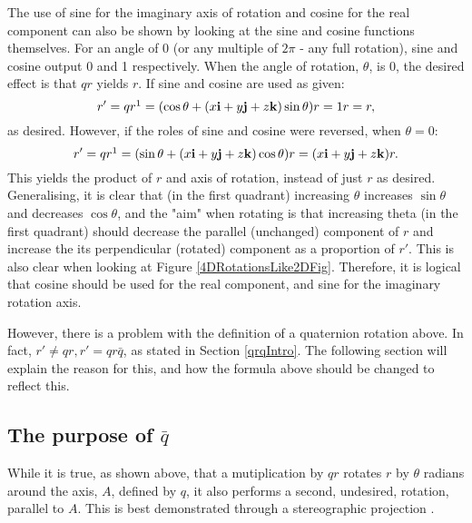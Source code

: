 \documentclass[10pt]{article}
\begin{document}
The use of sine for the imaginary axis of rotation and cosine for the real component can also be shown by looking at the sine and cosine functions themselves. For an angle of 0 (or any multiple of $2\pi$ - any full rotation), sine and cosine output 0 and 1 respectively. When the angle of rotation, $\theta$, is 0, the desired effect is that $qr$ yields $r$. If sine and cosine are used as given:
\begin{equation}
    r' = qr\footnotemark[1] = (\cos\theta + (x\vb{i} + y\vb{j} + z\vb{k})\sin\theta)r = 1r = r,
\end{equation}
as desired. However, if the roles of sine and cosine were reversed, when $\theta = 0$:
\begin{equation}
    r' = qr\footnotemark[1] = (\sin\theta + (x\vb{i} + y\vb{j} + z\vb{k})\cos\theta)r = (x\vb{i} + y\vb{j} + z\vb{k})r.
\end{equation}
This yields the product of $r$ and axis of rotation, instead of just $r$ as desired. Generalising, it is clear that (in the first quadrant) increasing $\theta$ increases $\sin\theta$ and decreases $\cos\theta$, and the "aim" when rotating is that increasing theta (in the first quadrant) should decrease the parallel (unchanged) component of $r$ and increase the its perpendicular (rotated) component as a proportion of $r'$. This is also clear when looking at Figure \ref{4DRotationsLike2DFig}. Therefore, it is logical that cosine should be used for the real component, and sine for the imaginary rotation axis.

However, there is a problem with the definition of a quaternion rotation above. In fact, $r' \neq qr, r' = qr\bar{q}$, as stated in Section \ref{qrqIntro}. The following section will explain the reason for this, and how the formula above should be changed to reflect this.

\subsection{The purpose of $\bar{q}$} \label{QBarSection}

While it is true, as shown above, that a mutiplication by $qr$ rotates $r$ by $\theta$ radians around the axis, $A$, defined by $q$, it also performs a second, undesired, rotation, parallel to $A$. This is best demonstrated through a stereographic projection \cite{Eater} \cite{Penguin}.
\end{document}
